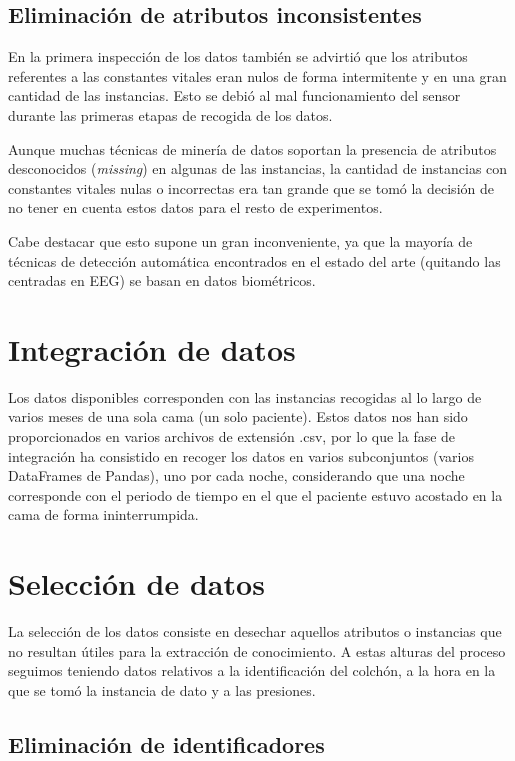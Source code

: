 \subsection{Eliminación de atributos inconsistentes}

En la primera inspección de los datos también se advirtió que los atributos referentes a las constantes vitales eran nulos de forma intermitente y en una gran cantidad de las instancias. Esto se debió al mal funcionamiento del sensor durante las primeras etapas de recogida de los datos. 

Aunque muchas técnicas de minería de datos soportan la presencia de atributos desconocidos (\textit{missing}) en algunas de las instancias, la cantidad de instancias con constantes vitales nulas o incorrectas era tan grande que se tomó la decisión de no tener en cuenta estos datos para el resto de experimentos.  

Cabe destacar que esto supone un gran inconveniente, ya que la mayoría de técnicas de detección automática encontrados en el estado del arte (quitando las centradas en EEG) se basan en datos biométricos. 

\section{Integración de datos}

Los datos disponibles corresponden con las instancias recogidas al lo largo de varios meses de una sola cama (un solo paciente). Estos datos nos han sido proporcionados en varios archivos de extensión .csv, por lo que la fase de integración ha consistido en recoger los datos en varios subconjuntos (varios DataFrames de Pandas), uno por cada noche, considerando que una noche corresponde con el periodo de tiempo en el que el paciente estuvo acostado en la cama de forma ininterrumpida. 

\section{Selección de datos}

La selección de los datos consiste en desechar aquellos atributos o instancias que no resultan útiles para la extracción de conocimiento. A estas alturas del proceso seguimos teniendo datos relativos a la identificación del colchón, a la hora en la que se tomó la instancia de dato y a las presiones. 

\subsection{Eliminación de identificadores}

